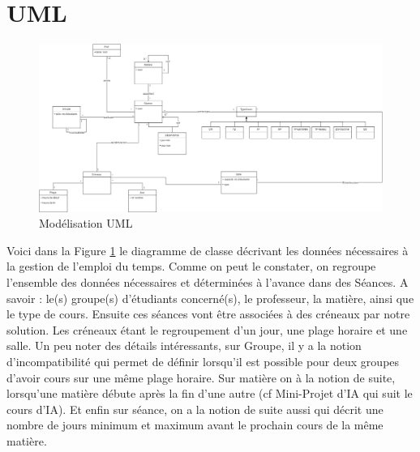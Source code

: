 \section{UML}

\begin{landscape}

    \begin{figure}[t]
        \includegraphics[keepaspectratio=true,width=26cm]{diagrammeClasse.png}
            \caption{\label{fig:uml} Modélisation UML}
    \end{figure}

\end{landscape}

Voici dans la Figure \ref{fig:uml} le diagramme de classe décrivant les données nécessaires à la gestion de l'emploi du temps.
Comme on peut le constater, on regroupe l'ensemble des données nécessaires et déterminées à l'avance dans des Séances. A savoir : le(s) groupe(s) d'étudiants concerné(s), le professeur, la matière, ainsi que le type de cours. Ensuite ces séances vont être associées à des créneaux par notre solution. Les créneaux étant le regroupement d'un jour, une plage horaire et une salle.
Un peu noter des détails intéressants, sur Groupe, il y a la notion d'incompatibilité qui permet de définir lorsqu'il est possible pour deux groupes d'avoir cours sur une même plage horaire. Sur matière on à la notion de suite, lorsqu'une matière débute après la fin d'une autre (cf Mini-Projet d'IA qui suit le cours d'IA). Et enfin sur séance, on a la notion de suite aussi qui décrit une nombre de jours minimum et maximum avant le prochain cours de la même matière.

